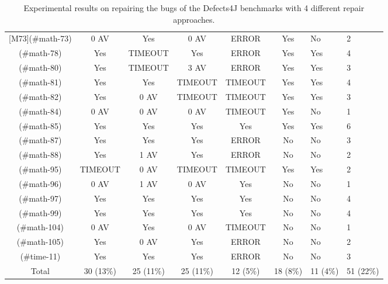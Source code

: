 \begin{table}[!t]
{\begin{tabular}{|c|c|c|c|c|c|}
[M73](#math-73)   & 0 AV      & Yes       & 0 AV      & ERROR     & Yes       & No        &      2 \\
[M78](#math-78)   & Yes       & TIMEOUT   & Yes       & ERROR     & Yes       & Yes       &      4 \\
[M80](#math-80)   & Yes       & TIMEOUT   & 3 AV      & ERROR     & Yes       & Yes       &      3 \\
[M81](#math-81)   & Yes       & Yes       & TIMEOUT   & TIMEOUT   & Yes       & Yes       &      4 \\
[M82](#math-82)   & Yes       & 0 AV      & TIMEOUT   & TIMEOUT   & Yes       & Yes       &      3 \\
[M84](#math-84)   & 0 AV      & 0 AV      & 0 AV      & TIMEOUT   & Yes       & No        &      1 \\
[M85](#math-85)   & Yes       & Yes       & Yes       & Yes       & Yes       & Yes       &      6 \\
[M87](#math-87)   & Yes       & Yes       & Yes       & ERROR     & No        & No        &      3 \\
[M88](#math-88)   & Yes       & 1 AV      & Yes       & ERROR     & No        & No        &      2 \\
[M95](#math-95)   & TIMEOUT   & 0 AV      & TIMEOUT   & TIMEOUT   & Yes       & Yes       &      2 \\
[M96](#math-96)   & 0 AV      & 1 AV      & 0 AV      & Yes       & No        & No        &      1 \\
[M97](#math-97)   & Yes       & Yes       & Yes       & Yes       & No        & No        &      4 \\
[M99](#math-99)   & Yes       & Yes       & Yes       & Yes       & No        & No        &      4 \\
[M104](#math-104) & 0 AV      & Yes       & 0 AV      & TIMEOUT   & No        & No        &      1 \\
[M105](#math-105) & Yes       & 0 AV      & Yes       & ERROR     & No        & No        &      2 \\
\hline
[T11](#time-11)   & Yes       & Yes       & Yes       & ERROR     & No        & No        &      3 \\
\hline
Total             & 30 (13\%) & 25 (11\%) & 25 (11\%) & 12 (5\%)  & 18 (8\%)  & 11 (4\%)  & 51 (22\%)\\
\hline 
\end{tabular}%
}
\caption{Experimental results on repairing the bugs of the Defects4J benchmarks with 4 different repair approaches.}
\end{table}
